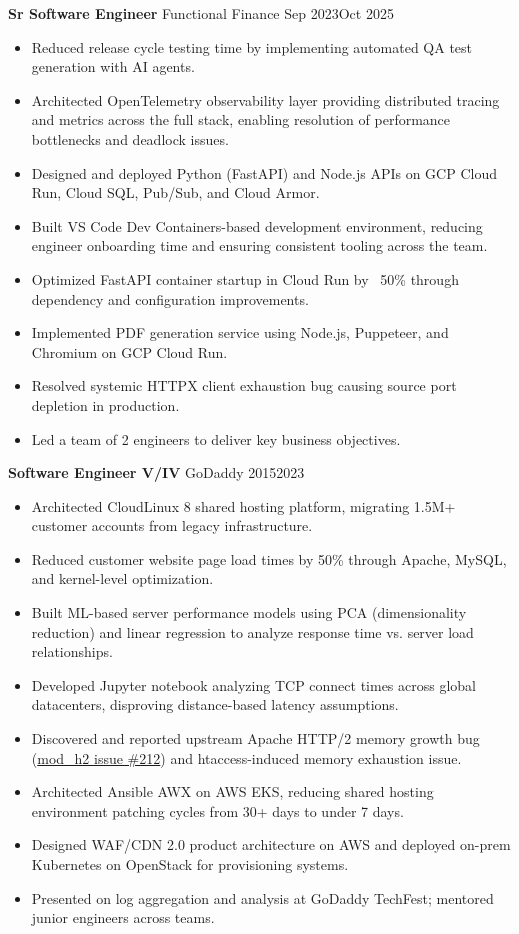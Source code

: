 \documentclass[11pt,letterpaper]{article}
\begin{document}
\textbf{Sr Software Engineer} \hfill Functional Finance \hfill Sep 2023\textendash{}Oct 2025
\begin{itemize}
  \item Reduced release cycle testing time by implementing automated QA test generation with AI agents.
  \item Architected OpenTelemetry observability layer providing distributed tracing and metrics across the full stack, enabling resolution of performance bottlenecks and deadlock issues.
  \item Designed and deployed Python (FastAPI) and Node.js APIs on GCP Cloud Run, Cloud SQL, Pub/Sub, and Cloud Armor.
  \item Built VS Code Dev Containers-based development environment, reducing engineer onboarding time and ensuring consistent tooling across the team.
  \item Optimized FastAPI container startup in Cloud Run by ~50\% through dependency and configuration improvements.
  \item Implemented PDF generation service using Node.js, Puppeteer, and Chromium on GCP Cloud Run.
  \item Resolved systemic HTTPX client exhaustion bug causing source port depletion in production.
  \item Led a team of 2 engineers to deliver key business objectives.
\end{itemize}

\textbf{Software Engineer V/IV} \hfill GoDaddy \hfill 2015\textendash{}2023
\begin{itemize}
  \item Architected CloudLinux 8 shared hosting platform, migrating 1.5M+ customer accounts from legacy infrastructure.
  \item Reduced customer website page load times by 50\% through Apache, MySQL, and kernel-level optimization.
  \item Built ML-based server performance models using PCA (dimensionality reduction) and linear regression to analyze response time vs. server load relationships.
  \item Developed Jupyter notebook analyzing TCP connect times across global datacenters, disproving distance-based latency assumptions.
  \item Discovered and reported upstream Apache HTTP/2 memory growth bug (\href{https://github.com/icing/mod_h2/issues/212\#issuecomment-954906013}{mod\_h2 issue \#212}) and htaccess-induced memory exhaustion issue.
  \item Architected Ansible AWX on AWS EKS, reducing shared hosting environment patching cycles from 30+ days to under 7 days.
  \item Designed WAF/CDN 2.0 product architecture on AWS and deployed on-prem Kubernetes on OpenStack for provisioning systems.
  \item Presented on log aggregation and analysis at GoDaddy TechFest; mentored junior engineers across teams.
\end{itemize}
\end{document}
